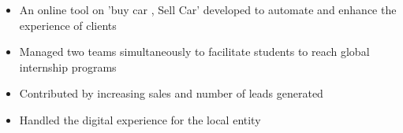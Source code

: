 \documentclass[10pt,a4paper]{altacv}
\begin{document}

\begin{fullwidth}
\makecvheader
\end{fullwidth}



\begin{itemize}
\item An online tool on 'buy car , Sell Car' developed to automate and enhance the experience of clients
\end{itemize}


\divider

\begin{itemize}
\item Managed two teams simultaneously to facilitate students to reach global internship programs
\item Contributed by increasing sales and number of leads generated
\item Handled the digital experience for the local entity
\end{itemize}
\end{document}
